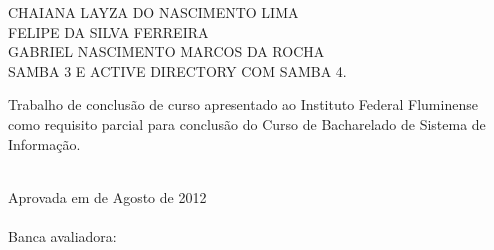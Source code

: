 \begin{folhadeaprovacao}
    \setlength{\ABNTsignthickness}{0.4pt}
    \setlength{\ABNTsignwidth}{15cm}
    \setlength{\ABNTsignskip}{0.9cm}
    \begin{center}
	{\large CHAIANA LAYZA DO NASCIMENTO LIMA} \\
	{\large FELIPE DA SILVA FERREIRA} \\	
	{\large GABRIEL NASCIMENTO MARCOS DA ROCHA} \\ [4cm]
	{\large SAMBA 3 E ACTIVE DIRECTORY COM SAMBA 4.}\\ [2cm]
        \hspace{.45\textwidth} %
        \begin{minipage}{0.5\textwidth}
        \begin{espacosimples}
        Trabalho de conclusão de curso apresentado ao Instituto Federal Fluminense como requisito parcial para conclusão do Curso de Bacharelado de Sistema de Informação.\\\\
        \end{espacosimples}
        \end{minipage}
    \end{center}
    Aprovada em  de Agosto de 2012 \\\\
    Banca avaliadora:
\end{folhadeaprovacao}
